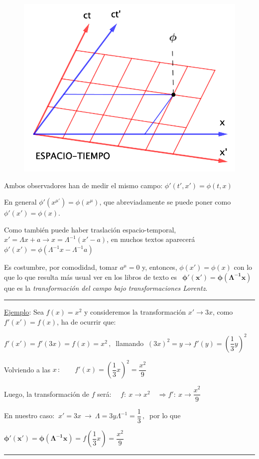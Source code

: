 \begin{multicols}{2}
\begin{figure}[H]
	\centering
	\includegraphics[width=.4\textwidth]{imagenes/img33-02.png}
\end{figure}	
Ambos observadores han de medir el mismo campo: $\phi'(t',x')=\phi(t,x)$

En general $\phi'(x^{\mu'})=\phi(x^\mu)$, que abreviadamente se puede poner como $\phi'(x')=\phi(x)$.

Como también puede haber traslación espacio-temporal, $x'=\Lambda x+a \to x=\Lambda^{-1}(x'-a)$, en muchos textos aparecerá $\phi'(x')=\phi(\Lambda^{-1} x - \Lambda^{-1} a) $ 
\end{multicols}

Es costumbre, por comodidad, tomar $a^\mu=0$ y, entonces, $\phi(x')=\phi(x)$ con lo que lo que resulta más usual ver en los libros de texto es        $\ \boxed{\ \boldsymbol{ \phi'(x')= \phi ( \Lambda^{-1} x) } \ } \ $ que es la \emph{transformación del campo bajo transformaciones Lorentz}.


\color{gris}

\rule{200pt}{0.1pt}

\underline{Ejemplo}:  Sea $f(x)=x^2$ y consideremos la transformación $x' \to 3x$, como $f'(x')=f(x)$, ha de ocurrir que:

$f'(x')=f'(3x)=f(x)=x^2 \, , \ $ llamando $\  (3x)^2=y \to f'(y)=\left(\dfrac 1 3 y \right)^2$

Volviendo a las $x\, : \qquad f'(x)=\left( \dfrac 1 3 x \right)^2=\dfrac{x^2}{9}$

Luego, la transformación de $f$ será: $\quad f:\ x \to x^2 \quad \Rightarrow f':\ x \to \dfrac{x^2}9$

En nuestro caso: $\ x'=3x \ \to \ \Lambda=3 y \Lambda^{-1}=\dfrac 1 3 \, , \ $ por lo que

$\boldsymbol{ \phi'(x')= \phi ( \Lambda^{-1} x) } = f \left( \dfrac 1 3 x \right) = \dfrac {x^2}9$

\vspace{-7mm} \begin{flushright}\rule{200pt}{0.1pt}\end{flushright}

